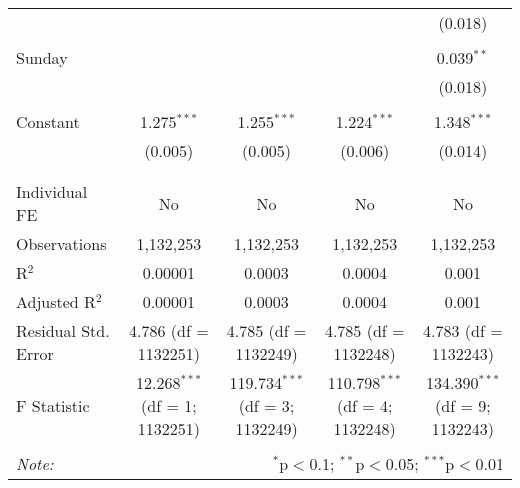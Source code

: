 \documentclass[
]{article}
\begin{document}
\begin{table}[!htbp]
{\begin{tabular}{@{\extracolsep{5pt}}lcccc}
  &  &  &  & (0.018) \\ 
  & & & & \\ 
 Sunday &  &  &  & 0.039$^{**}$ \\ 
  &  &  &  & (0.018) \\ 
  & & & & \\ 
 Constant & 1.275$^{***}$ & 1.255$^{***}$ & 1.224$^{***}$ & 1.348$^{***}$ \\ 
  & (0.005) & (0.005) & (0.006) & (0.014) \\ 
  & & & & \\ 
\hline \\[-1.8ex] 
Individual FE & No & No & No & No \\ 
Observations & 1,132,253 & 1,132,253 & 1,132,253 & 1,132,253 \\ 
R$^{2}$ & 0.00001 & 0.0003 & 0.0004 & 0.001 \\ 
Adjusted R$^{2}$ & 0.00001 & 0.0003 & 0.0004 & 0.001 \\ 
Residual Std. Error & 4.786 (df = 1132251) & 4.785 (df = 1132249) & 4.785 (df = 1132248) & 4.783 (df = 1132243) \\ 
F Statistic & 12.268$^{***}$ (df = 1; 1132251) & 119.734$^{***}$ (df = 3; 1132249) & 110.798$^{***}$ (df = 4; 1132248) & 134.390$^{***}$ (df = 9; 1132243) \\ 
\hline 
\hline \\[-1.8ex] 
\textit{Note:}  & \multicolumn{4}{r}{$^{*}$p$<$0.1; $^{**}$p$<$0.05; $^{***}$p$<$0.01} \\ 
\end{tabular}
} 
\end{table} 
\newpage
\end{document}
